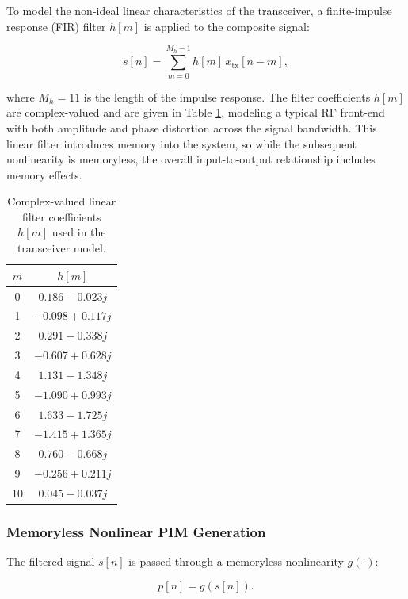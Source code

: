 To model the non-ideal linear characteristics of the transceiver, a finite-impulse response (FIR) filter \( h[m] \) is applied to the composite signal:

\begin{equation}
s[n] = \sum_{m=0}^{M_h - 1} h[m] \, x_{\mathrm{tx}}[n - m],
\end{equation}

where \( M_h = 11 \) is the length of the impulse response. The filter coefficients \( h[m] \) are complex-valued and are given in Table \ref{tab:filter_coeffs}, modeling a typical RF front-end with both amplitude and phase distortion across the signal bandwidth. This linear filter introduces memory into the system, so while the subsequent nonlinearity is memoryless, the overall input-to-output relationship includes memory effects.

\begin{table}[h]
\centering
\caption{Complex-valued linear filter coefficients \( h[m] \) used in the transceiver model.}
\label{tab:filter_coeffs}
\begin{tabular}{|c|c|}
\hline
\( m \) & \( h[m] \) \\
\hline
0 & \( 0.186 - 0.023j \) \\
1 & \( -0.098 + 0.117j \) \\
2 & \( 0.291 - 0.338j \) \\
3 & \( -0.607 + 0.628j \) \\
4 & \( 1.131 - 1.348j \) \\
5 & \( -1.090 + 0.993j \) \\
6 & \( 1.633 - 1.725j \) \\
7 & \( -1.415 + 1.365j \) \\
8 & \( 0.760 - 0.668j \) \\
9 & \( -0.256 + 0.211j \) \\
10 & \( 0.045 - 0.037j \) \\
\hline
\end{tabular}
\end{table}

\subsubsection{Memoryless Nonlinear PIM Generation}

The filtered signal \( s[n] \) is passed through a memoryless nonlinearity \( g(\cdot) \):

\begin{equation}
p[n] = g\left(s[n]\right).
\end{equation}


